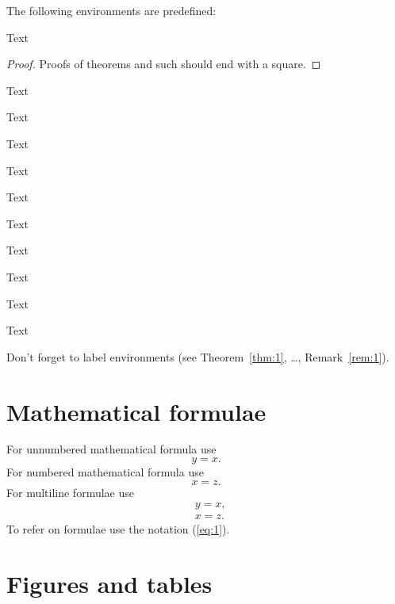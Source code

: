 \documentclass[dvips]{radhazu}
\begin{document}
The following environments are predefined:
\begin{theorem}\label{thm:1}
Text
\end{theorem}
\begin{proof}
Proofs of theorems and such should end with a square.
\end{proof}
\begin{corollary}\label{cor:1}
Text
\end{corollary}
\begin{conjecture}\label{con:1}
Text
\end{conjecture}
\begin{lemma}\label{lem:1}
Text
\end{lemma}
\begin{proposition}\label{pro:1}
Text
\end{proposition}
\begin{axiom}\label{axi:1}
Text
\end{axiom}
\begin{exercise}\label{exe:1}
Text
\end{exercise}
\begin{problem}\label{prob:1}
Text
\end{problem}
\begin{definition}\label{def:1}
Text
\end{definition}
\begin{example}\label{exa:1}
Text
\end{example}
\begin{remark}\label{rem:1}
Text
\end{remark}
Don't forget to label environments (see Theorem~\ref{thm:1},
\ldots, Remark~\ref{rem:1}).

\section{Mathematical formulae}

For unnumbered mathematical formula use
$$%
y=x.
$$%
For numbered mathematical formula use
\begin{equation}\label{eq:1}
x=z.
\end{equation}
For multiline formulae use
\begin{align}
&y=x,\\
&x=z. %
\end{align}
To refer on formulae use the notation (\ref{eq:1}).

\section{Figures and tables}
\end{document}
